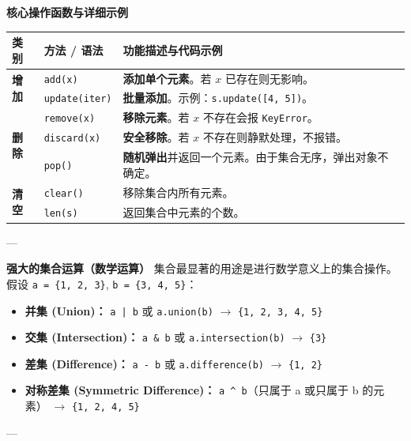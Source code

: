\documentclass{article}
\begin{document}
\textbf{核心操作函数与详细示例}
\begin{table}[h]
\centering
\renewcommand{\arraystretch}{1.4}
\begin{tabular}{|l|l|p{8cm}|}
\hline
\textbf{类别} & \textbf{方法 / 语法} & \textbf{功能描述与代码示例} \\ \hline
\multirow{2}{*}{\textbf{增加}} & \texttt{add(x)} & \textbf{添加单个元素}。若 $x$ 已存在则无影响。 \\ \cline{2-3} 
 & \texttt{update(iter)} & \textbf{批量添加}。示例：\texttt{s.update([4, 5])}。 \\ \hline
\multirow{3}{*}{\textbf{删除}} & \texttt{remove(x)} & \textbf{移除元素}。若 $x$ 不存在会报 \texttt{KeyError}。 \\ \cline{2-3} 
 & \texttt{discard(x)} & \textbf{安全移除}。若 $x$ 不存在则静默处理，不报错。 \\ \cline{2-3} 
 & \texttt{pop()} & \textbf{随机弹出}并返回一个元素。由于集合无序，弹出对象不确定。 \\ \hline
\multirow{2}{*}{\textbf{清空}} & \texttt{clear()} & 移除集合内所有元素。 \\ \cline{2-3} 
 & \texttt{len(s)} & 返回集合中元素的个数。 \\ \hline
\end{tabular}
\end{table}

---

\textbf{强大的集合运算（数学运算）}
集合最显著的用途是进行数学意义上的集合操作。假设 \texttt{a = \{1, 2, 3\}}, \texttt{b = \{3, 4, 5\}}：
\begin{itemize}
    \item \textbf{并集 (Union)：} \texttt{a | b} 或 \texttt{a.union(b)} $\rightarrow$ \texttt{\{1, 2, 3, 4, 5\}}
    \item \textbf{交集 (Intersection)：} \texttt{a \& b} 或 \texttt{a.intersection(b)} $\rightarrow$ \texttt{\{3\}}
    \item \textbf{差集 (Difference)：} \texttt{a - b} 或 \texttt{a.difference(b)} $\rightarrow$ \texttt{\{1, 2\}}
    \item \textbf{对称差集 (Symmetric Difference)：} \texttt{a \^{} b}（只属于 a 或只属于 b 的元素） $\rightarrow$ \texttt{\{1, 2, 4, 5\}}
\end{itemize}

---
\end{document}
